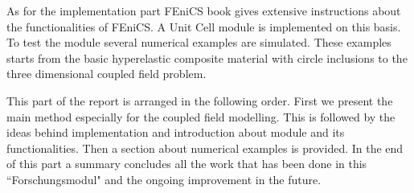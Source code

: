 \documentclass[10pt,a4paper]{scrreprt}
\begin{document}
As for the implementation part FEniCS book \citep{wells2012automated} gives extensive instructions about the functionalities of FEniCS. A Unit Cell module is implemented on this basis. To test the module several numerical examples are simulated. These examples starts from the basic hyperelastic composite material with circle inclusions to the three dimensional coupled field problem. 

This part of the report is arranged in the following order. First we present the main method especially for the coupled field modelling. This is followed by the ideas behind implementation and introduction about module and its functionalities. Then a section about numerical examples is provided. In the end of this part a summary concludes all the work that has been done in this ``Forschungsmodul" and the ongoing improvement in the future.
\end{document}
